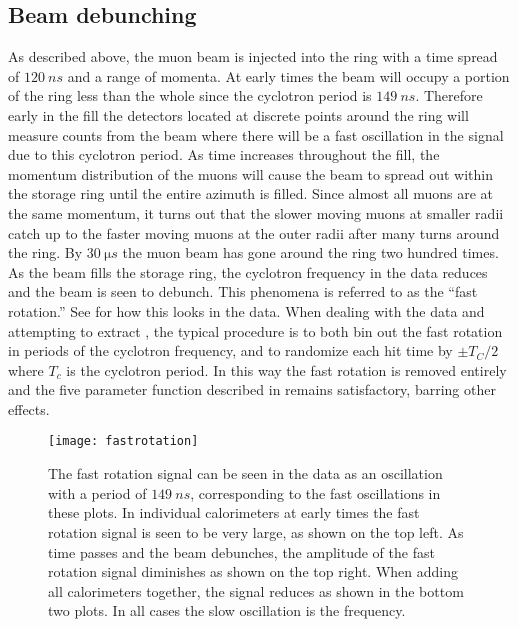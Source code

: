 \subsection{Beam debunching}

As described above, the muon beam is injected into the ring with a time spread of $\SI{120}{ns}$ and a range of momenta. At early times the beam will occupy a portion of the ring less than the whole since the cyclotron period is $\SI{149}{ns}$. Therefore early in the fill the detectors located at discrete points around the ring will measure counts from the beam where there will be a fast oscillation in the signal due to this cyclotron period. As time increases throughout the fill, the momentum distribution of the muons will cause the beam to spread out within the storage ring until the entire azimuth is filled. Since almost all muons are at the same momentum, it turns out that the slower moving muons at smaller radii catch up to the faster moving muons at the outer radii after many turns around the ring. By $\SI{30}{\micro s}$ the muon beam has gone around the ring two hundred times. As the beam fills the storage ring, the cyclotron frequency in the data reduces and the beam is seen to debunch. This phenomena is referred to as the ``fast rotation.'' See  for how this looks in the data. When dealing with the data and attempting to extract \wa, the typical procedure is to both bin out the fast rotation in periods of the cyclotron frequency, and to randomize each hit time by $\pm T_{C}/2$ where $T_{c}$ is the cyclotron period. In this way the fast rotation is removed entirely and the five parameter function described in  remains satisfactory, barring other effects. 

\begin{figure}[]
    \centering
    \texttt{[image: fastrotation]}
    \caption[Beam debunching fast rotation]{The fast rotation signal can be seen in the data as an oscillation with a period of $\SI{149}{ns}$, corresponding to the fast oscillations in these plots. In individual calorimeters at early times the fast rotation signal is seen to be very large, as shown on the top left. As time passes and the beam debunches, the amplitude of the fast rotation signal diminishes as shown on the top right. When adding all calorimeters together, the signal reduces as shown in the bottom two plots. In all cases the slow oscillation is the \gmtwo frequency.}
    \label{fig:fastrotation}
\end{figure}



